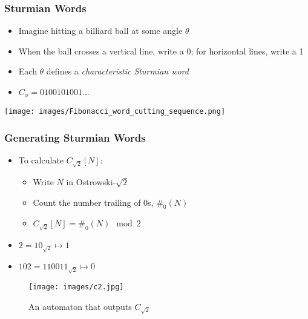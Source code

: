 \documentclass[leqno,presentation]{beamer}
\begin{document}
\begin{frame}
    \frametitle{Sturmian Words}
    
    \begin{itemize}
        \item Imagine hitting a billiard ball at some angle $\theta$
        \item When the ball crosses a vertical line, write a 0; for horizontal lines, write a 1
        \item Each $\theta$ defines a \textit{characteristic Sturmian word}
        \item $C_\phi = 0100101001\ldots$
    \end{itemize}
    \texttt{[image: images/Fibonacci\_word\_cutting\_sequence.png]}
\end{frame}

\begin{frame}
    \frametitle{Generating Sturmian Words}
    \begin{itemize}
        \item To calculate $C_{\sqrt{2}}[N]$:
            \begin{itemize}
                \item Write $N$ in Ostrowski-$\sqrt{2}$
                \item Count the number trailing of $0$s, $\#_0(N)$
                \item $C_{\sqrt{2}}[N] = \#_0(N) \mod{2}$
            \end{itemize}
    
        \item $2 = 10_{\sqrt{2}} \mapsto 1$
        \item $102 = 110011_{\sqrt{2}} \mapsto 0$
    \end{itemize}
    
    \begin{figure}
        \centering
        \texttt{[image: images/c2.jpg]}
        \caption{An automaton that outputs $C_{\sqrt{2}}$}
        \label{fig:c2}
    \end{figure}
\end{frame}
\end{document}
